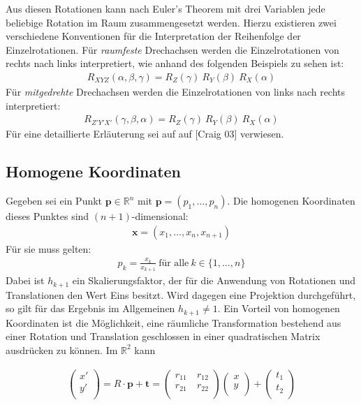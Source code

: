 Aus diesen Rotationen kann nach Euler's Theorem mit drei Variablen jede beliebige Rotation im Raum zusammengesetzt werden. Hierzu existieren zwei verschiedene Konventionen für die Interpretation der Reihenfolge der Einzelrotationen. Für \emph{raumfeste} Drechachsen werden die Einzelrotationen von rechts nach links interpretiert, wie anhand des folgenden Beispiels zu sehen ist:
\begin{eqnarray}
R_{XYZ}(\alpha,\beta,\gamma) = R_Z(\gamma)\ R_Y(\beta)\ R_X(\alpha)
\nonumber
\end{eqnarray}
Für \emph{mitgedrehte} Drechachsen werden die Einzelrotationen von links nach rechts interpretiert:
\begin{eqnarray}
R_{Z'Y'X'}(\gamma,\beta,\alpha) = R_Z(\gamma)\ R_Y(\beta)\ R_X(\alpha)
\nonumber
\end{eqnarray}
Für eine detaillierte Erläuterung sei auf auf [Craig 03] verwiesen.


\subsection{Homogene Koordinaten}
\label{anhang_b_homogenous}
Gegeben sei ein Punkt $\bm{p}\in\mathbb{R}^n$ mit $\bm{p} = (p_1,\ldots,p_n)$. Die homogenen Koordinaten dieses Punktes sind $(n+1)$-dimensional:
\begin{eqnarray}
\bm{x} = (x_1,\ldots,x_n, x_{n+1})\nonumber
\end{eqnarray}
Für sie muss gelten:
\begin{eqnarray}
p_k = \frac{x_k}{x_{k+1}}\ \text{für alle}\ k\in\{1,\ldots,n\}\nonumber
\end{eqnarray}
Dabei ist $h_{k+1}$ ein Skalierungsfaktor, der für die Anwendung von Rotationen und Translationen den Wert Eins besitzt. Wird dagegen eine Projektion durchgeführt, so gilt für das Ergebnis im Allgemeinen $h_{k+1}\neq1$. Ein Vorteil von homogenen Koordinaten ist die Möglichkeit, eine räumliche Transformation bestehend aus einer Rotation und Translation geschlossen in einer quadratischen Matrix ausdrücken zu können. Im $\mathbb{R}^2$ kann

\begin{eqnarray}
\left(
\begin{array}{c}
x'\\
y'\\
\end{array}
\right) = R\cdot\bm{p}+\bm{t} =
\left(
\begin{array}{cc}
r_{11}\ & r_{12}\\
r_{21}\ & r_{22}\\
\end{array}
\right)
\left(
\begin{array}{c}
x\\
y\\
\end{array}
\right) +
\left(
\begin{array}{c}
t_1\\
t_2\\
\end{array}
\right)%
\end{eqnarray}

